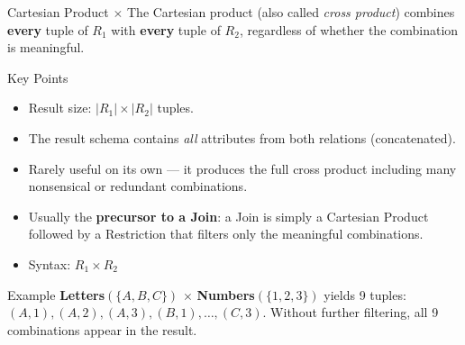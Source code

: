 \begin{frame}{Cartesian Product $\times$}
  The Cartesian product (also called \emph{cross product}) combines
  \textbf{every} tuple of $R_1$ with \textbf{every} tuple of $R_2$,
  regardless of whether the combination is meaningful.

  \begin{block}{Key Points}
    \begin{itemize}
      \item Result size: $|R_1| \times |R_2|$ tuples.
      \item The result schema contains \emph{all} attributes from both
            relations (concatenated).
      \item Rarely useful on its own — it produces the full cross product
            including many nonsensical or redundant combinations.
      \item Usually the \textbf{precursor to a Join}: a Join is simply a
            Cartesian Product followed by a Restriction that filters only
            the meaningful combinations.
      \item Syntax: $R_1 \times R_2$
    \end{itemize}
  \end{block}

  \begin{examples}{Example}
    \textbf{Letters}$(\{A, B, C\})$ $\times$ \textbf{Numbers}$(\{1, 2,
    3\})$ yields 9 tuples: $(A,1), (A,2), (A,3), (B,1), \ldots, (C,3)$.
    Without further filtering, all 9 combinations appear in the result.
  \end{examples}
\end{frame}
